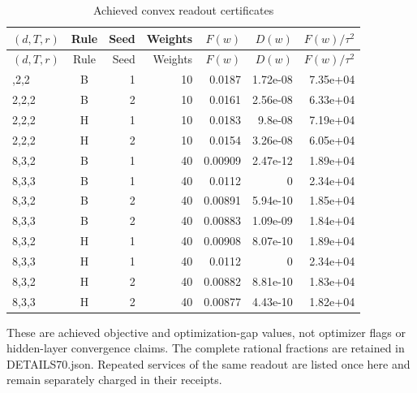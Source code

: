 \begingroup\small\setlength{\tabcolsep}{3pt}
\begin{longtable}{lcrrrrr}
\caption{Achieved convex readout certificates}\label{tab:training70}\\
\hline
$(d,T,r)$ & Rule & Seed & Weights & $F(w)$ & $D(w)$ & $F(w)/\tau^2$ \\
\hline\endfirsthead
\hline
$(d,T,r)$ & Rule & Seed & Weights & $F(w)$ & $D(w)$ & $F(w)/\tau^2$ \\
\hline\endhead
\hline\endfoot
\hline\endlastfoot
2,2,2 & B & 1 & 10 & 0.0187 & 1.72e-08 & 7.35e+04 \\
2,2,2 & B & 2 & 10 & 0.0161 & 2.56e-08 & 6.33e+04 \\
2,2,2 & H & 1 & 10 & 0.0183 & 9.8e-08 & 7.19e+04 \\
2,2,2 & H & 2 & 10 & 0.0154 & 3.26e-08 & 6.05e+04 \\
8,3,2 & B & 1 & 40 & 0.00909 & 2.47e-12 & 1.89e+04 \\
8,3,3 & B & 1 & 40 & 0.0112 & 0 & 2.34e+04 \\
8,3,2 & B & 2 & 40 & 0.00891 & 5.94e-10 & 1.85e+04 \\
8,3,3 & B & 2 & 40 & 0.00883 & 1.09e-09 & 1.84e+04 \\
8,3,2 & H & 1 & 40 & 0.00908 & 8.07e-10 & 1.89e+04 \\
8,3,3 & H & 1 & 40 & 0.0112 & 0 & 2.34e+04 \\
8,3,2 & H & 2 & 40 & 0.00882 & 8.81e-10 & 1.83e+04 \\
8,3,3 & H & 2 & 40 & 0.00877 & 4.43e-10 & 1.82e+04 \\
\end{longtable}\endgroup
{\footnotesize These are achieved objective and optimization-gap values, not optimizer flags or hidden-layer convergence claims. The complete rational fractions are retained in DETAILS70.json. Repeated services of the same readout are listed once here and remain separately charged in their receipts.}\par
